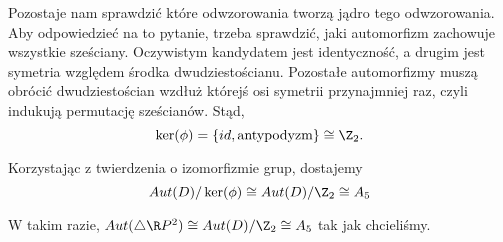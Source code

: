 Pozostaje nam sprawdzić które odwzorowania tworzą jądro tego odwzorowania. Aby odpowiedzieć na to pytanie, trzeba sprawdzić, jaki automorfizm zachowuje wszystkie sześciany. Oczywistym kandydatem jest identyczność, a drugim jest symetria względem środka dwudziestościanu. Pozostałe automorfizmy muszą obrócić dwudziestościan wzdłuż którejś osi symetrii przynajmniej raz, czyli indukują permutację sześcianów. Stąd, 
$$\ker(\phi)=\{id, \text{antypodyzm}\}\cong \Z_2.$$

Korzystając z twierdzenia o izomorfizmie grup, dostajemy
$$Aut(D)/\ker(\phi)\cong Aut(D)/\Z_2\cong A_5$$

W takim razie, $Aut(\triangle \R P^2)\cong Aut(D)/\Z_2\cong A_5$ tak jak chcieliśmy.







%
%
%
%
%
%
